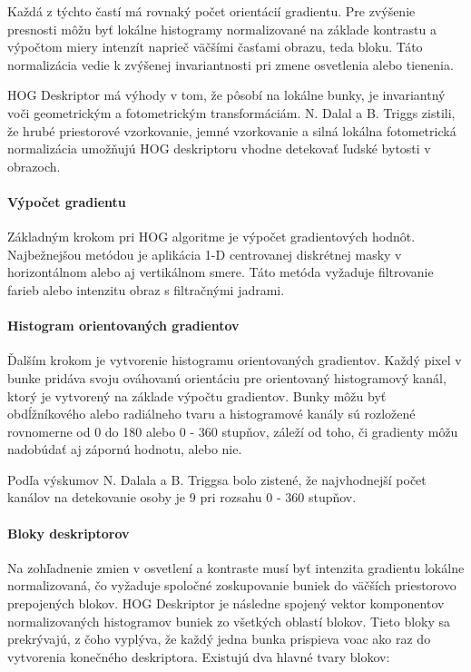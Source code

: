 Každá z týchto častí  má rovnaký počet orientácií gradientu.  Pre zvýšenie presnosti môžu byť lokálne histogramy normalizované na základe kontrastu a výpočtom miery intenzít naprieč väčšími časťami obrazu, teda bloku. Táto normalizácia vedie k zvýšenej invariantnosti pri zmene osvetlenia alebo tienenia. 

HOG Deskriptor má výhody v tom, že pôsobí na lokálne bunky, je invariantný voči geometrickým a fotometrickým transformáciám. N. Dalal a B. Triggs zistili, že hrubé priestorové vzorkovanie, jemné vzorkovanie a silná lokálna fotometrická normalizácia umožňujú HOG deskriptoru vhodne detekovať ľudské bytosti v obrazoch. 

\paragraph{Výpočet gradientu}

Základným krokom pri HOG algoritme je výpočet gradientových hodnôt. Najbežnejšou metódou je aplikácia 1-D centrovanej diskrétnej masky v horizontálnom alebo aj vertikálnom smere. Táto metóda vyžaduje filtrovanie farieb alebo intenzitu obraz s filtračnými jadrami.

\paragraph{Histogram orientovaných gradientov}
Ďalším krokom je vytvorenie histogramu orientovaných gradientov. Každý pixel v bunke pridáva svoju ováhovanú orientáciu pre orientovaný histogramový kanál, ktorý je vytvorený na základe výpočtu gradientov. Bunky môžu byť obdĺžníkového alebo radiálneho tvaru a histogramové kanály sú rozložené rovnomerne od 0 do 180 alebo 0 - 360 stupňov, záleží od toho, či gradienty môžu nadobúdať aj zápornú hodnotu, alebo nie. 

Podľa výskumov  N. Dalala a B. Triggsa bolo zistené, že najvhodnejší počet kanálov na detekovanie osoby je 9 pri rozsahu 0 - 360 stupňov.

\paragraph{Bloky deskriptorov}
Na zohľadnenie zmien v osvetlení a kontraste musí byť intenzita gradientu lokálne normalizovaná, čo vyžaduje spoločné zoskupovanie buniek do väčších priestorovo prepojených blokov. HOG Deskriptor je následne spojený vektor komponentov normalizovaných histogramov buniek zo všetkých oblastí blokov. Tieto bloky sa prekrývajú, z čoho vyplýva, že každý jedna bunka prispieva voac ako raz do vytvorenia konečného deskriptora. Existujú dva hlavné tvary blokov:

